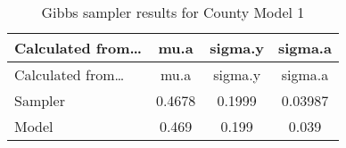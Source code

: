 \documentclass[12pt,twoside]{reedthesis}
\begin{document}
  \begin{longtable}[]{@{}lccc@{}}
  \caption{Gibbs sampler results for County Model 1
  \label{tab:gibbs_1}}\tabularnewline
  \toprule
  \begin{minipage}[b]{0.26\columnwidth}\raggedright\strut
  Calculated from\ldots{}\strut
  \end{minipage} & \begin{minipage}[b]{0.11\columnwidth}\centering\strut
  mu.a\strut
  \end{minipage} & \begin{minipage}[b]{0.12\columnwidth}\centering\strut
  sigma.y\strut
  \end{minipage} & \begin{minipage}[b]{0.12\columnwidth}\centering\strut
  sigma.a\strut
  \end{minipage}\tabularnewline
  \midrule
  \endfirsthead
  \toprule
  \begin{minipage}[b]{0.26\columnwidth}\raggedright\strut
  Calculated from\ldots{}\strut
  \end{minipage} & \begin{minipage}[b]{0.11\columnwidth}\centering\strut
  mu.a\strut
  \end{minipage} & \begin{minipage}[b]{0.12\columnwidth}\centering\strut
  sigma.y\strut
  \end{minipage} & \begin{minipage}[b]{0.12\columnwidth}\centering\strut
  sigma.a\strut
  \end{minipage}\tabularnewline
  \midrule
  \endhead
  \begin{minipage}[t]{0.26\columnwidth}\raggedright\strut
  Sampler\strut
  \end{minipage} & \begin{minipage}[t]{0.11\columnwidth}\centering\strut
  0.4678\strut
  \end{minipage} & \begin{minipage}[t]{0.12\columnwidth}\centering\strut
  0.1999\strut
  \end{minipage} & \begin{minipage}[t]{0.12\columnwidth}\centering\strut
  0.03987\strut
  \end{minipage}\tabularnewline
  \begin{minipage}[t]{0.26\columnwidth}\raggedright\strut
  Model\strut
  \end{minipage} & \begin{minipage}[t]{0.11\columnwidth}\centering\strut
  0.469\strut
  \end{minipage} & \begin{minipage}[t]{0.12\columnwidth}\centering\strut
  0.199\strut
  \end{minipage} & \begin{minipage}[t]{0.12\columnwidth}\centering\strut
  0.039\strut
  \end{minipage}\tabularnewline
  \bottomrule
  \end{longtable}
  
\end{document}
